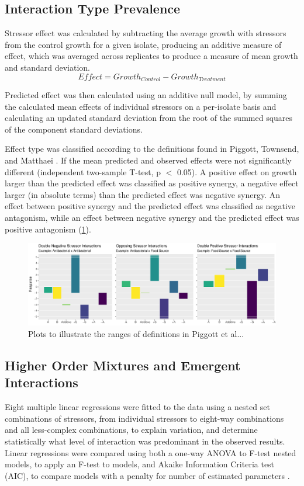 \documentclass[final,1p,times]{elsarticle}
\begin{document}
\subsection{Interaction Type Prevalence}
\label{S:2:9}
Stressor effect was calculated by subtracting the average growth with stressors from the control growth for a given isolate, producing an additive measure of effect, which was averaged across replicates to produce a measure of mean growth and standard deviation.
\begin{equation}
Effect = Growth_{Control} - Growth_{Treatment}
\label{E:effect_calc}
\end{equation}

Predicted effect was then calculated using an additive null model, by summing the calculated mean effects of individual stressors on a per-isolate basis and calculating an updated standard deviation from the root of the summed squares of the component standard deviations. 

Effect type was classified according to the definitions found in Piggott, Townsend, and Matthaei \cite{Piggott2015}. If the mean predicted and observed effects were not significantly different (independent two-sample T-test, p $<$ 0.05). A positive effect on growth larger than the predicted effect was classified as positive synergy, a negative effect larger (in absolute terms) than the predicted effect was negative synergy. An effect between positive synergy and the predicted effect was classified as negative antagonism, while an effect between negative synergy and the predicted effect was positive antagonism (\cref{fig:interaction_ranges}). 

\begin{figure}[H]
    \centering
    \includegraphics[width = \textwidth]{Scripts/Results/Plot_Interactions_Illustrative.pdf}
    \caption{Plots to illustrate the ranges of definitions in Piggott et al...}
    \label{fig:interaction_ranges}
\end{figure}

\subsection{Higher Order Mixtures and Emergent Interactions}
\label{S:2:10}
Eight multiple linear regressions were fitted to the data using a nested set combinations of stressors, from individual stressors to eight-way combinations and all less-complex combinations, to explain variation, and determine statistically what level of interaction was predominant in the observed results. Linear regressions were compared using both a one-way ANOVA to F-test nested models, to apply an F-test to models, and Akaike Information Criteria test (AIC), to compare models with a penalty for number of estimated parameters \cite{Akaike1974}. 
\end{document}
